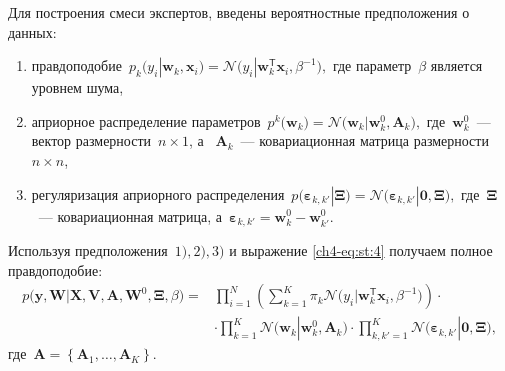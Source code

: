 \documentclass{dissert}
\begin{document}
Для построения смеси экспертов, введены вероятностные предположения о данных:
\begin{enumerate}[1)]
	\item правдоподобие~$p_{k}\bigr(y_{i}|\mathbf{w}_{k}, \mathbf{x}_{i}\bigr) = \mathcal{N}\bigr(y_{i}|\mathbf{w}_{k}^{\mathsf{T}}\mathbf{x}_{i}, \beta^{-1}\bigr),$ где параметр~$\beta$ является уровнем шума,
	\item априорное распределение параметров~$p^{k}\bigr(\mathbf{w}_{k}\bigr) = \mathcal{N}\bigr(\mathbf{w}_{k}|\mathbf{w}^{0}_{k}, \mathbf{A}_{k}\bigr),$ где~$\mathbf{w}^{0}_{k}$~--- вектор размерности~$n\times1$, а ~$\mathbf{A}_{k}$~--- ковариационная матрица размерности~$n\times n$,
	\item регуляризация априорного распределения~$p\bigr(\bm{\varepsilon}_{k,k'}|\bm{\Xi}\bigr) = \mathcal{N}\bigr(\bm{\varepsilon}_{k,k'}|\mathbf{0},  \bm{\Xi}\bigr),$ где~$\bm{\Xi}$~--- ковариационная матрица, а~$\bm{\varepsilon}_{k,k'} = \mathbf{w}_{k}^{0}-\mathbf{w}_{k'}^{0}.$
\end{enumerate}

Используя предположения~$1), 2), 3)$ и выражение \eqref{ch4-eq:st:4} получаем полное правдоподобие:
\[
\label{ch4-eq:em:1}
\begin{aligned}
p\bigr(\mathbf{y}, \mathbf{W}|\mathbf{X}, \mathbf{V}, \textbf{A}, \textbf{W}^{0}, \bm{\Xi}, \beta\bigr) = &\prod_{i=1}^{N}\left(\sum_{k=1}^{K}\pi_{k}\mathcal{N}\bigr(y_{i}|\mathbf{w}_{k}^{\mathsf{T}}\mathbf{x}_{i}, \beta^{-1}\bigr)\right)\cdot\\
&\cdot\prod_{k=1}^{K}\mathcal{N}\bigr(\mathbf{w}_{k}|\mathbf{w}^{0}_{k}, \mathbf{A}_{k}\bigr)\cdot\prod_{k,k'=1}^{K}\mathcal{N}\bigr(\bm{\varepsilon}_{k,k'}|\mathbf{0},  \bm{\Xi}\bigr),
\end{aligned}
\]
где~$\mathbf{A} = \left\{\mathbf{A}_1, \ldots, \mathbf{A}_K\right\}.$
\end{document}
